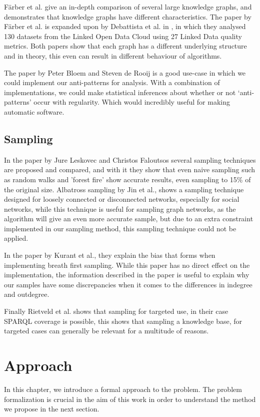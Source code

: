 \documentclass[11pt,letterpaper ,oneside ]{book}
\begin{document}
	F\"arber et al. \cite{MichaelF:2017} give an in-depth comparison of several large knowledge graphs, and demonstrates that knowledge graphs have different characteristics. The paper by F\"arber et al. \cite{MichaelF:2017} is expanded upon by Debattista et al. in \cite{Debattista:2018}, in which they analysed 130 datasets from the Linked Open Data Cloud using 27 Linked Data quality metrics. Both papers show that each graph has a different underlying structure and in theory, this even can result in different behaviour of algorithms.
	
	The paper by Peter Bloem and Steven de Rooij\cite{BloemP:2018} is a good use-case in which we could implement our anti-patterns for analysis. With a combination of implementations, we could make statistical inferences about whether or not `anti-patterns' occur with regularity. Which would incredibly useful for making automatic software.
	
	\section{Sampling}
	In the paper by Jure Leskovec and Christos Faloutsos \cite{Leskovec:2006} several sampling techniques are proposed and compared, and with it they show that even naive sampling such as random walks and 'forest fire' show accurate results, even sampling to 15\% of the original size. 
	Albatross sampling by Jin et al.\cite{Jin:2011}, shows a sampling technique designed for loosely connected or disconnected networks, especially for social networks, while this technique is useful for sampling graph networks, as the algorithm will give an even more accurate sample, but due to an extra constraint implemented in our sampling method, this sampling technique could not be applied.
	
	In the paper by Kurant et al.\cite{Kurant:2011}, they explain the bias that forms when implementing breath first sampling.
	While this paper has no direct effect on the implementation, the information described in the paper is useful to explain why our samples have some discrepancies when it comes to the differences in indegree and outdegree. 
	
	Finally Rietveld et al.\cite{Rietveld:2014} shows that sampling for targeted use, in their case SPARQL coverage is possible, this shows that sampling a knowledge base, for targeted cases can generally be relevant for a multitude of reasons.
	
	
	\newpage
	\chapter{Approach}\label{ProblemDefintion}
	In this chapter, we introduce a formal approach to the problem. The problem formalization is crucial in the aim of this work in order to understand the method we propose in the next section.
	
\end{document}
